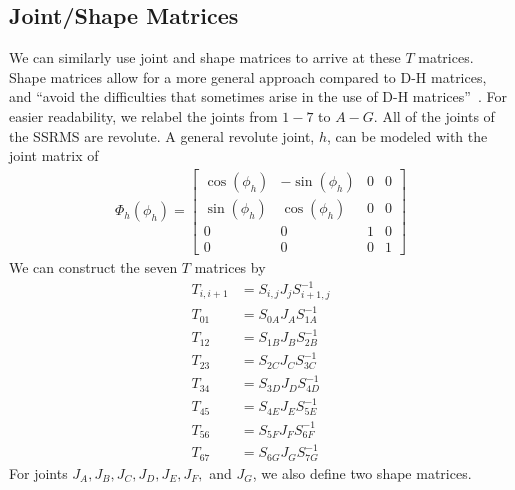 \documentclass{article}
\begin{document}
\subsection{Joint/Shape Matrices}
We can similarly use joint and shape matrices to arrive at these $T$ matrices.
Shape matrices allow for a more general approach compared to D-H matrices, and ``avoid the difficulties that sometimes arise in the use of D-H matrices''~\cite{uicker2013matrix}.
For easier readability, we relabel the joints from $1-7$ to $A-G$.
All of the joints of the SSRMS are revolute.
A general revolute joint, $h$, can be modeled with the joint matrix of
\begin{align*}
\Phi_h \left( \phi_h \right) =
\left[\begin{matrix}
\cos\left( \phi_h \right) & -\sin\left( \phi_h \right) & 0 & 0 \\
\sin\left( \phi_h \right) & \cos\left( \phi_h \right) & 0 & 0 \\
0 & 0 & 1 & 0 \\
0 & 0 & 0 & 1
\end{matrix}\right]
\end{align*}
We can construct the seven $T$ matrices by
\begin{align}
T_{i,i+1} &= S_{i, j} J_j S_{i+1,j}^{-1} \label{joint_eq} \\
T_{01} &= S_{0A} J_A S_{1A}^{-1} \nonumber \\
T_{12} &= S_{1B} J_B S_{2B}^{-1} \nonumber \\
T_{23} &= S_{2C} J_C S_{3C}^{-1} \nonumber \\
T_{34} &= S_{3D} J_D S_{4D}^{-1} \nonumber \\
T_{45} &= S_{4E} J_E S_{5E}^{-1} \nonumber \\
T_{56} &= S_{5F} J_F S_{6F}^{-1} \nonumber \\
T_{67} &= S_{6G} J_G S_{7G}^{-1} \nonumber
\end{align}
For joints $J_A, J_B, J_C, J_D, J_E, J_F,$ and $J_G$, we also define two shape matrices.
\end{document}
